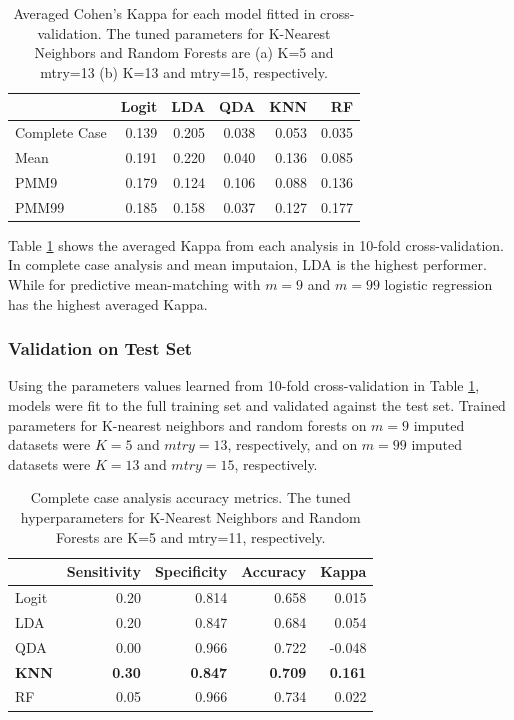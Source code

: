 \documentclass[12pt,]{article}
\begin{document}
\begin{table}[!h]

\caption{\label{tab:unnamed-chunk-7}\label{tab:cv-kappa} Averaged Cohen's Kappa for each model fitted in cross-validation.  The tuned parameters for K-Nearest Neighbors and Random Forests are (a) K=5 and mtry=13 (b) K=13 and mtry=15, respectively.}
\centering
\fontsize{10}{12}\selectfont
\begin{tabular}{lrrrrr}
\toprule
  & Logit & LDA & QDA & KNN & RF\\
\midrule
Complete Case & 0.139 & 0.205 & 0.038 & 0.053 & 0.035\\
Mean & 0.191 & 0.220 & 0.040 & 0.136 & 0.085\\
PMM9 & 0.179 & 0.124 & 0.106 & 0.088 & 0.136\\
PMM99 & 0.185 & 0.158 & 0.037 & 0.127 & 0.177\\
\bottomrule
\end{tabular}
\end{table}

Table \ref{tab:cv-kappa} shows the averaged Kappa from each analysis in
10-fold cross-validation. In complete case analysis and mean imputaion,
LDA is the highest performer. While for predictive mean-matching with
\(m=9\) and \(m=99\) logistic regression has the highest averaged Kappa.

\subsubsection{Validation on Test Set}\label{validation-on-test-set}

Using the parameters values learned from 10-fold cross-validation in
Table \ref{tab:cv-kappa}, models were fit to the full training set and
validated against the test set. Trained parameters for K-nearest
neighbors and random forests on \(m=9\) imputed datasets were \(K=5\)
and \(mtry=13\), respectively, and on \(m=99\) imputed datasets were
\(K=13\) and \(mtry=15\), respectively.

\begin{table}[!h]

\caption{\label{tab:unnamed-chunk-8}\label{tab:cc-metrics} Complete case analysis accuracy metrics.  The tuned hyperparameters for K-Nearest Neighbors and Random Forests are K=5 and mtry=11, respectively.}
\centering
\fontsize{10}{12}\selectfont
\begin{tabular}{lrrrr}
\toprule
  & Sensitivity & Specificity & Accuracy & Kappa\\
\midrule
Logit & 0.20 & 0.814 & 0.658 & 0.015\\
LDA & 0.20 & 0.847 & 0.684 & 0.054\\
QDA & 0.00 & 0.966 & 0.722 & -0.048\\
\textbf{KNN} & \textbf{0.30} & \textbf{0.847} & \textbf{0.709} & \textbf{0.161}\\
RF & 0.05 & 0.966 & 0.734 & 0.022\\
\bottomrule
\end{tabular}
\end{table}
\end{document}
